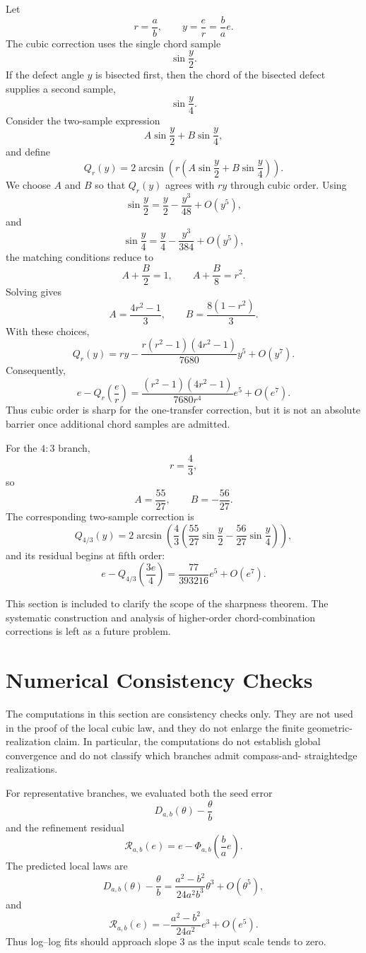 \documentclass[11pt]{article}
\theoremstyle{definition}
\theoremstyle{remark}
\newcommand{\Rop}{\mathscr{R}}
\newcommand{\Phiop}{\Phi}
\newcommand{\Qop}{Q}
\begin{document}
Let
\[
r=\frac{a}{b},
\qquad
 y=\frac{e}{r}=\frac{b}{a}e.
\]
The cubic correction uses the single chord sample
\[
\sin\frac{y}{2}.
\]
If the defect angle $y$ is bisected first, then the chord of the bisected
defect supplies a second sample,
\[
\sin\frac{y}{4}.
\]
Consider the two-sample expression
\[
A\sin\frac{y}{2}
+
B\sin\frac{y}{4},
\]
and define
\[
\Qop_r(y)
=
2\arcsin\!\left(
r\left(
A\sin\frac{y}{2}
+
B\sin\frac{y}{4}
\right)
\right).
\]
We choose $A$ and $B$ so that $\Qop_r(y)$ agrees with $ry$ through cubic order.
Using
\[
\sin\frac{y}{2}
=
\frac{y}{2}-\frac{y^3}{48}+O(y^5),
\]
and
\[
\sin\frac{y}{4}
=
\frac{y}{4}-\frac{y^3}{384}+O(y^5),
\]
the matching conditions reduce to
\[
A+\frac{B}{2}=1,
\qquad
A+\frac{B}{8}=r^2.
\]
Solving gives
\[
A=\frac{4r^2-1}{3},
\qquad
B=\frac{8(1-r^2)}{3}.
\]
With these choices,
\[
\Qop_r(y)
=
ry
-
\frac{r(r^2-1)(4r^2-1)}{7680}y^5
+
O(y^7).
\]
Consequently,
\[
e-
\Qop_r\!\left(\frac{e}{r}\right)
=
\frac{(r^2-1)(4r^2-1)}{7680r^4}e^5
+
O(e^7).
\]
Thus cubic order is sharp for the one-transfer correction, but it is not an
absolute barrier once additional chord samples are admitted.

For the $4:3$ branch,
\[
r=\frac{4}{3},
\]
so
\[
A=\frac{55}{27},
\qquad
B=-\frac{56}{27}.
\]
The corresponding two-sample correction is
\[
\Qop_{4/3}(y)
=
2\arcsin\!\left(
\frac{4}{3}
\left(
\frac{55}{27}\sin\frac{y}{2}
-
\frac{56}{27}\sin\frac{y}{4}
\right)
\right),
\]
and its residual begins at fifth order:
\[
e-
\Qop_{4/3}\!\left(\frac{3e}{4}\right)
=
\frac{77}{393216}e^5
+
O(e^7).
\]

This section is included to clarify the scope of the sharpness theorem.  The
systematic construction and analysis of higher-order chord-combination
corrections is left as a future problem.

\section{Numerical Consistency Checks}
\label{sec:numerical}

The computations in this section are consistency checks only.  They are not
used in the proof of the local cubic law, and they do not enlarge the finite
geometric-realization claim.  In particular, the computations do not establish
global convergence and do not classify which branches admit compass-and-
straightedge realizations.

For representative branches, we evaluated both the seed error
\[
D_{a,b}(\theta)-\frac{\theta}{b}
\]
and the refinement residual
\[
\Rop_{a,b}(e)
=
e-
\Phiop_{a,b}\!\left(\frac{b}{a}e\right).
\]
The predicted local laws are
\[
D_{a,b}(\theta)-\frac{\theta}{b}
=
\frac{a^2-b^2}{24a^2b^3}\theta^3+O(\theta^5),
\]
and
\[
\Rop_{a,b}(e)
=
-
\frac{a^2-b^2}{24a^2}e^3+O(e^5).
\]
Thus log--log fits should approach slope $3$ as the input scale tends to zero.
\end{document}
